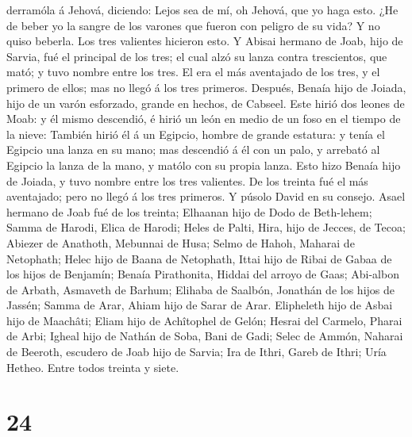derramóla á Jehová, diciendo:  Lejos sea de mí, oh Jehová,
que yo haga esto. ¿He de beber yo la sangre de los varones que fueron
con peligro de su vida? Y no quiso beberla. Los tres valientes hicieron
esto.  Y Abisai hermano de Joab, hijo de Sarvia, fué el
principal de los tres; el cual alzó su lanza contra trescientos, que
mató; y tuvo nombre entre los tres.  El era el más
aventajado de los tres, y el primero de ellos; mas no llegó á los tres
primeros.  Después, Benaía hijo de Joiada, hijo de un varón
esforzado, grande en hechos, de Cabseel. Este hirió dos leones de Moab:
y él mismo descendió, é hirió un león en medio de un foso en el tiempo
de la nieve:  También hirió él á un Egipcio, hombre de
grande estatura: y tenía el Egipcio una lanza en su mano; mas descendió
á él con un palo, y arrebató al Egipcio la lanza de la mano, y matólo
con su propia lanza.  Esto hizo Benaía hijo de Joiada, y
tuvo nombre entre los tres valientes.  De los treinta fué
el más aventajado; pero no llegó á los tres primeros. Y púsolo David en
su consejo.  Asael hermano de Joab fué de los treinta;
Elhaanan hijo de Dodo de Beth-lehem;  Samma de Harodi,
Elica de Harodi;  Heles de Palti, Hira, hijo de Jecces, de
Tecoa;  Abiezer de Anathoth, Mebunnai de Husa;
 Selmo de Hahoh, Maharai de Netophath;  Helec
hijo de Baana de Netophath, Ittai hijo de Ribai de Gabaa de los hijos de
Benjamín;  Benaía Pirathonita, Hiddai del arroyo de Gaas;
 Abi-albon de Arbath, Asmaveth de Barhum; 
Elihaba de Saalbón, Jonathán de los hijos de Jassén;  Samma
de Arar, Ahiam hijo de Sarar de Arar.  Elipheleth hijo de
Asbai hijo de Maachâti; Eliam hijo de Achîtophel de Gelón; 
Hesrai del Carmelo, Pharai de Arbi;  Igheal hijo de Nathán
de Soba, Bani de Gadi;  Selec de Ammón, Naharai de Beeroth,
escudero de Joab hijo de Sarvia;  Ira de Ithri, Gareb de
Ithri;  Uría Hetheo. Entre todos treinta y siete.

\hypertarget{section-23}{%
\section{24}\label{section-23}}

